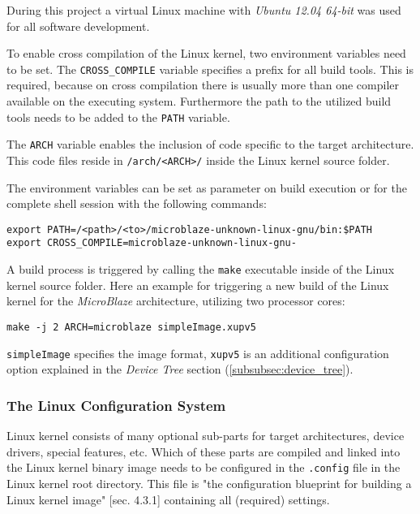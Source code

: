 During this project a virtual Linux machine with \textit{Ubuntu 12.04 64-bit} was used for all software development.

To enable cross compilation of the Linux kernel, two environment variables need to be set. The \texttt{CROSS\_COMPILE} variable specifies a prefix for all build tools. This is required, because on cross compilation there is usually more than one compiler available on the executing system. Furthermore the path to the utilized build tools needs to be added to the \texttt{PATH} variable.

The \texttt{ARCH} variable enables the inclusion of code specific to the target architecture. This code files reside in \texttt{/arch/<ARCH>/} inside the Linux kernel source folder. 

The environment variables can be set as parameter on build execution or for the complete shell session with the following commands:

\begin{verbatim}
export PATH=/<path>/<to>/microblaze-unknown-linux-gnu/bin:$PATH
export CROSS_COMPILE=microblaze-unknown-linux-gnu-
\end{verbatim}

A build process is triggered by calling the \texttt{make} executable inside of the Linux kernel source folder. Here an example for triggering a new build of the Linux kernel for the \textit{MicroBlaze} architecture, utilizing two processor cores:

\begin{verbatim}
make -j 2 ARCH=microblaze simpleImage.xupv5
\end{verbatim}

\texttt{simpleImage} specifies the image format, \texttt{xupv5} is an additional configuration option explained in the \textit{Device Tree} section (\ref{subsubsec:device_tree}).

\subsubsection{The Linux Configuration System}

Linux kernel consists of many optional sub-parts for target architectures, device drivers, special features, etc. Which of these parts are compiled and linked into the Linux kernel binary image needs to be configured in the \texttt{.config} file in the Linux kernel root directory. This file is "the configuration blueprint for building a Linux kernel image" \cite{linuxPrimer}[sec. 4.3.1] containing all (required) settings.

